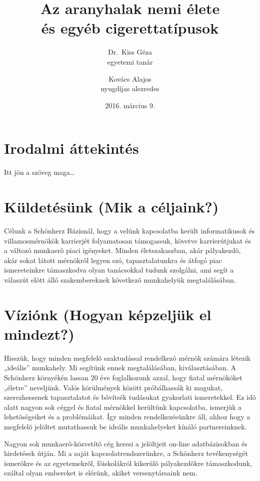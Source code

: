 \documentclass[a4paper]{article}
\begin{document}
\title{Az aranyhalak nemi élete \\
és egyéb cigerettatípusok}
\author{Dr.~Kiss Géza \\ egyetemi tanár \and
Kovács Alajos \\ nyugdíjas alezredes}
\date{2016. március 9.}


\maketitle

\tableofcontents

\section{Irodalmi áttekintés}
Itt jön a szöveg maga\dots

\section{Küldetésünk (Mik a céljaink?)}
Célunk a Schönherz Bázisnál, hogy a velünk kapcsolatba került informatikusok és villamosmérnökök karrierjét folyamatosan támogassuk, követve karrierútjukat és a változó munkaerõ piaci igényeket. Minden életszakaszban, akár pályakezdõ, akár sokat látott mérnökrõl legyen szó, tapasztalatunkra és átfogó piac ismereteinkre támaszkodva olyan tanácsokkal tudunk szolgálni, ami segít a válaszút elõtt álló szakembereknek következõ munkahelyük megtalálásában.
\section{Víziónk (Hogyan képzeljük el mindezt?)}
Hisszük, hogy minden megfelelõ szaktudással rendelkezõ mérnök számára létezik „ideális” munkahely. Mi segítünk ennek megtalálásában, kiválasztásában. A Schönherz környékén lassan 20 éve foglalkozunk azzal, hogy fiatal mérnököket „életre” neveljünk. Valós körülmények között próbálhassák ki magukat, sze\-rezhessenek tapasztalatot és bõvítsék tudásukat gyakorlati ismeretekkel. Ez idõ alatt nagyon sok céggel és fiatal mérnökkel kerültünk kapcsolatba, ismerjük a lehetõségeiket és a problémáikat. Így minden rendelkezésünkre áll, ahhoz hogy a megfelelõ jelöltet mutathassuk be ideális munkahelyeket kínáló partnereinknek.

Nagyon sok munkaerõ-közvetítõ cég keresi a jelöltjeit on-line adatbázisokban és hirdetések útján. Mi a saját kapcsolatrendszerünkre, a Schönherz tevékenységét ismerõkre és az egyetemekrõl, fõiskolákról kikerülõ pályakezdõkre támaszkodunk, ezáltal olyan embereket is elérünk, akiket versenytársaink nem.
\end{document}
